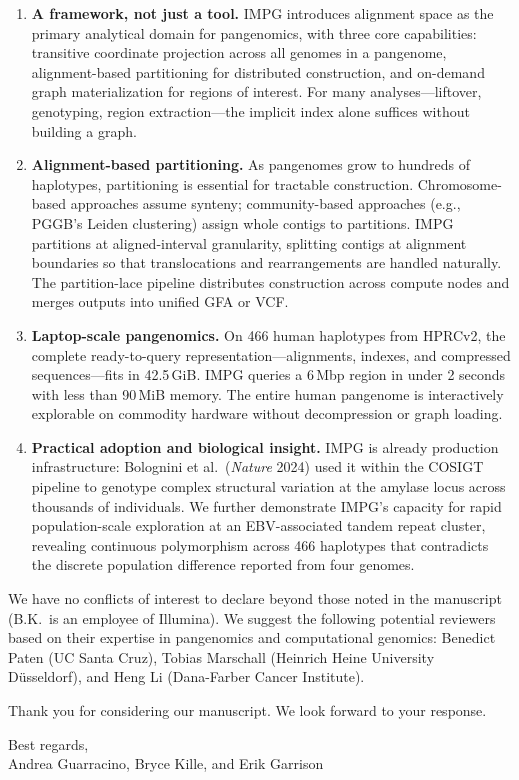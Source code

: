 \begin{enumerate}
\item \textbf{A framework, not just a tool.} IMPG introduces alignment space as the primary analytical domain for pangenomics, with three core capabilities: transitive coordinate projection across all genomes in a pangenome, alignment-based partitioning for distributed construction, and on-demand graph materialization for regions of interest. For many analyses---liftover, genotyping, region extraction---the implicit index alone suffices without building a graph.

\item \textbf{Alignment-based partitioning.} As pangenomes grow to hundreds of haplotypes, partitioning is essential for tractable construction. Chromosome-based approaches assume synteny; community-based approaches (e.g., PGGB's Leiden clustering) assign whole contigs to partitions. IMPG partitions at aligned-interval granularity, splitting contigs at alignment boundaries so that translocations and rearrangements are handled naturally. The partition-lace pipeline distributes construction across compute nodes and merges outputs into unified GFA or VCF.

\item \textbf{Laptop-scale pangenomics.} On 466 human haplotypes from HPRCv2, the complete ready-to-query representation---alignments, indexes, and compressed sequences---fits in 42.5\,GiB. IMPG queries a 6\,Mbp region in under 2 seconds with less than 90\,MiB memory. The entire human pangenome is interactively explorable on commodity hardware without decompression or graph loading.

\item \textbf{Practical adoption and biological insight.} IMPG is already production infrastructure: Bolognini et al.\ (\textit{Nature} 2024) used it within the COSIGT pipeline to genotype complex structural variation at the amylase locus across thousands of individuals. We further demonstrate IMPG's capacity for rapid population-scale exploration at an EBV-associated tandem repeat cluster, revealing continuous polymorphism across 466 haplotypes that contradicts the discrete population difference reported from four genomes.
\end{enumerate}

We have no conflicts of interest to declare beyond those noted in the manuscript (B.K.\ is an employee of Illumina). We suggest the following potential reviewers based on their expertise in pangenomics and computational genomics: Benedict Paten (UC Santa Cruz), Tobias Marschall (Heinrich Heine University D\"usseldorf), and Heng Li (Dana-Farber Cancer Institute).

Thank you for considering our manuscript. We look forward to your response.

\medskip
\noindent Best regards,\\
Andrea Guarracino, Bryce Kille, and Erik Garrison
